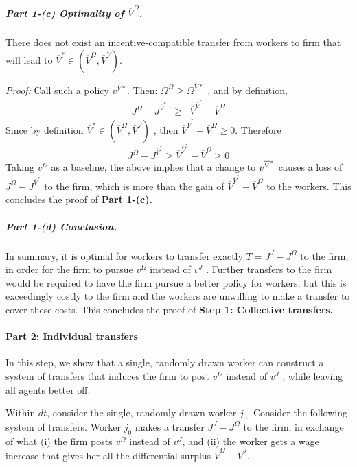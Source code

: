 \subparagraph{Part 1-(c) Optimality of $\overline{V}^\Omega$.}

There does not exist an incentive-compatible transfer from workers to firm
that will lead to $\overline{V}^{\ast}\in\left(\overline{V}^{\Omega},\overline{V}^{\overline{V}%
}\right)$.\newline

\textit{Proof:} Call such a policy $v^{\overline{V}\ast}.$ Then: $%
\Omega^{\Omega}\geq\Omega^{\overline{V}\ast}$ , and by definition,
\begin{eqnarray*}
J^{\Omega}-J^{\overline{V}^{\ast}} & \geq & \overline{V}^{\overline{V}^{\ast}}-\overline{V}%
^{\Omega}
\end{eqnarray*}
Since by definition $\overline{V}^{\ast}\in\left(\overline{V}^{\Omega},\overline{V}^{\overline{V}%
}\right)$ , then $\overline{V}^{\overline{V}^{\ast}}-\overline{V}^{\Omega}\geq0$. Therefore
\begin{equation*}
J^{\Omega}-J^{\overline{V}^{\ast}}\geq\overline{V}^{\overline{V}^{\ast}}-\overline{V}%
^{\Omega}\geq0
\end{equation*}
Taking $v^{\Omega}$ as a baseline, the above implies that a change to $v^{%
\overline{V}^{\ast}}$ causes a loss of $J^{\Omega}-J^{\overline{V}^{\ast}}$ to the
firm, which is more than the gain of $\overline{V}^{\overline{V}^{\ast}}-\overline{V}%
^{\Omega}$ to the workers. This concludes the proof of \textbf{Part 1-(c).}

\subparagraph{Part 1-(d) Conclusion.}

In summary, it is optimal for workers to transfer exactly $T=J^{J}-J^{\Omega}
$ to the firm, in order for the firm to pursue $v^{\Omega}$ instead of $v^J$%
. Further transfers to the firm would be required to have the firm pursue a
better policy for workers, but this is exceedingly costly to the firm and
the workers are unwilling to make a transfer to cover these costs. This
concludes the proof of \textbf{Step 1: Collective transfers.}

\paragraph{Part 2: Individual transfers}

In this step, we show that a single, randomly drawn worker can construct a
system of transfers that induces the firm to post $v^\Omega$ instead of $v^J$%
, while leaving all agents better off.

Within $dt$, consider the single, randomly drawn worker $j_0$. Consider the
following system of transfers. Worker $j_0$ makes a transfer $J^J-J^\Omega$
to the firm, in exchange of what (i) the firm posts $v^\Omega$ instead of $%
v^J$, and (ii) the worker gets a wage increase that gives her all the
differential surplus $\overline{V}^\Omega-\overline{V}^J$.

